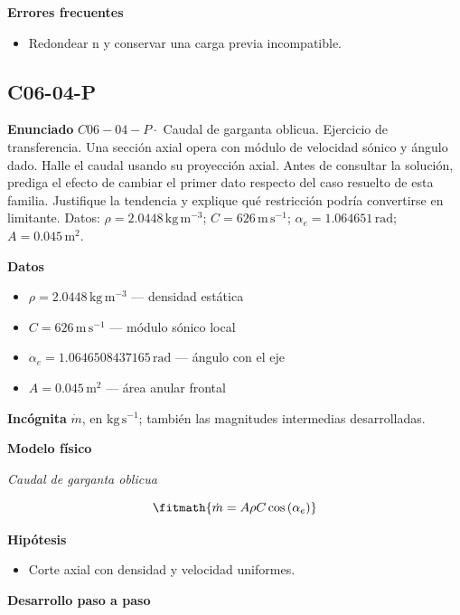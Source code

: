\documentclass[10pt,openany]{book}
\begin{document}
\noindent\textbf{Errores frecuentes}
\begin{itemize}
\item Redondear n y conservar una carga previa incompatible.
\end{itemize}
\subsection*{C06-04-P}

\noindent\textbf{Enunciado}
\(C06-04-P \cdot\) Caudal de garganta oblicua. Ejercicio de transferencia. Una sección axial opera con módulo de velocidad sónico y ángulo dado. Halle el caudal usando su proyección axial. Antes de consultar la solución, prediga el efecto de cambiar el primer dato respecto del caso resuelto de esta familia. Justifique la tendencia y explique qué restricción podría convertirse en limitante. Datos: \(\rho=2.0448\, \mathrm{kg}\,\mathrm{m}^{-3}\); \(C=626\, \mathrm{m}\,\mathrm{s}^{-1}\); \(\alpha_e=1.064651\, \mathrm{rad}\); \(A=0.045\, \mathrm{m}^{2}\).

\noindent\textbf{Datos}
\begin{itemize}
\item $\rho = 2.0448\,\mathrm{kg}\,\mathrm{m}^{-3}$ — densidad estática
\item $C = 626\,\mathrm{m}\,\mathrm{s}^{-1}$ — módulo sónico local
\item $\alpha_e = 1.0646508437165\,\mathrm{rad}$ — ángulo con el eje
\item $A = 0.045\,\mathrm{m}^{2}$ — área anular frontal
\end{itemize}

\noindent\textbf{Incógnita}
$\dot{m}$, en $\mathrm{kg\,s^{-1}}$; también las magnitudes intermedias desarrolladas.

\noindent\textbf{Modelo físico}

\noindent\textit{Caudal de garganta oblicua}

\[
\fitmath{\dot m=A \rho C \cos{\left(\alpha_e \right)}}
\]

\noindent\textbf{Hipótesis}
\begin{itemize}
\item Corte axial con densidad y velocidad uniformes.
\end{itemize}

\noindent\textbf{Desarrollo paso a paso}


\end{document}
